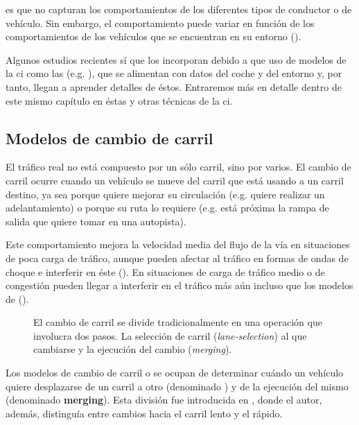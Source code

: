  es que no capturan los comportamientos de los diferentes tipos de conductor o de vehículo. Sin embargo, el comportamiento puede variar en función de los comportamientos de los vehículos que se encuentran en su entorno (\cite{Tordeux2010}).

Algunos estudios recientes sí que los incorporan debido a que uso de modelos de la \gls{ci} como las  (e.g. \cite{Simonelli2009, Fusco2013}), que se alimentan con datos del coche y del entorno y, por tanto, llegan a aprender detalles de éstos. Entraremos más en detalle dentro de este mismo capítulo en éstas y otras técnicas de la \gls{ci}.


\subsection{Modelos de cambio de carril}

El tráfico real no está compuesto por un sólo carril, sino por varios. El cambio de carril ocurre cuando un vehículo se mueve del carril que está usando a un carril destino, ya sea porque quiere mejorar su circulación (e.g. quiere realizar un adelantamiento) o porque su ruta lo requiere (e.g. está próxima la rampa de salida que quiere tomar en una autopista).

Este comportamiento mejora la velocidad media del flujo de la vía en situaciones de poca carga de tráfico, aunque pueden afectar al tráfico en formas de ondas de choque e interferir en éste (\cite{Sasoh2002, Jin2006}). En situaciones de carga de tráfico medio o de congestión pueden llegar a interferir en el tráfico más aún incluso que los modelos de \textit{} (\cite{Laval2006}).

\begin{figure}
	\caption{El cambio de carril se divide tradicionalmente en una operación que involucra dos pasos. La selección de carril (\textit{lane-selection}) al que cambiarse y la ejecución del cambio (\textit{merging}).}
	\label{fig:lane-selection-plus-merging}
\end{figure}

Los modelos de cambio de carril o \textit{} se ocupan de determinar cuándo un vehículo quiere desplazarse de un carril a otro (denominado \textbf{}) y de la ejecución del mismo (denominado \textbf{merging}). Esta división fue introducida en \cite{Sparmann1978}, donde el autor, además, distinguía entre cambios hacia el carril lento y el rápido.

